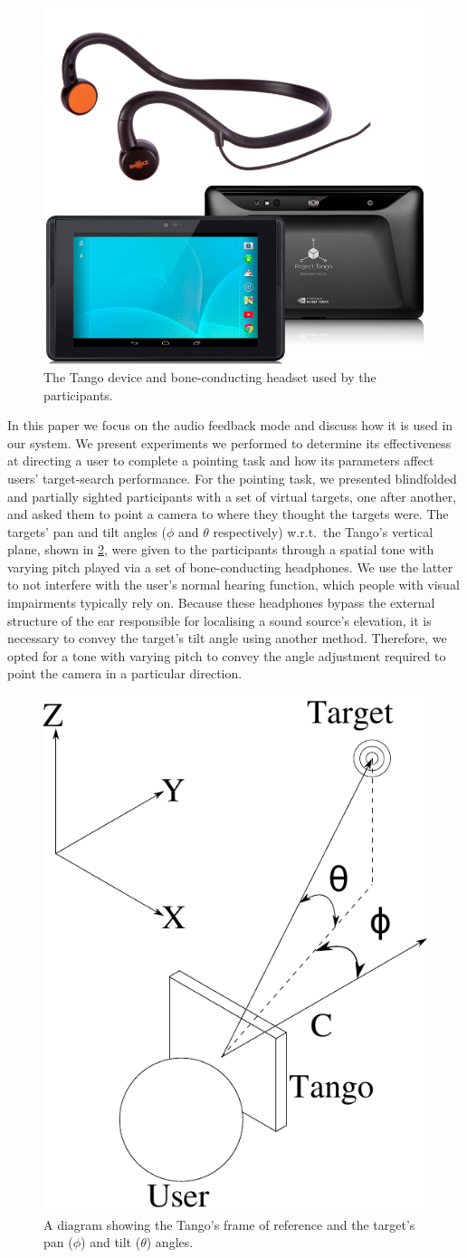 \documentclass[sigconf, review=true, screen=true, anonymous=true]{acmart}
\begin{document}
\begin{figure}
  \centering
  \includegraphics[width=0.5\columnwidth]{figures/tango_headphone.png}
  \caption{The Tango device and bone-conducting headset used by the participants. }\label{fig:tango-headphone}
\end{figure}

In this paper we focus on the audio feedback mode and discuss how it is used in our system.
We present experiments we performed to determine its effectiveness at directing a user to complete a pointing task and how its parameters affect users' target-search performance.
For the pointing task, we presented blindfolded and partially sighted participants with a set of virtual targets, one after another, and asked them to point a camera to where they thought the targets were.
The targets' pan and tilt angles ($\phi$ and $\theta$ respectively) w.r.t.\ the Tango's vertical plane, shown in \cref{fig:cam-coords}, were given to the participants through a spatial tone with varying pitch played via a set of bone-conducting headphones.
We use the latter to not interfere with the user's normal hearing function, which people with visual impairments typically rely on.
Because these headphones bypass the external structure of the ear responsible for localising a sound source's elevation, it is necessary to convey the target's tilt angle using another method.
Therefore, we opted for a tone with varying pitch to convey the angle adjustment required to point the camera in a particular direction.

\begin{figure}
  \centering
  \includegraphics[width=0.4\columnwidth]{figures/camera_coordinate.pdf}
  \caption{A diagram showing the Tango's frame of reference and the target's pan ($\phi$) and tilt ($\theta$) angles.}\label{fig:cam-coords}
\end{figure}
\end{document}
